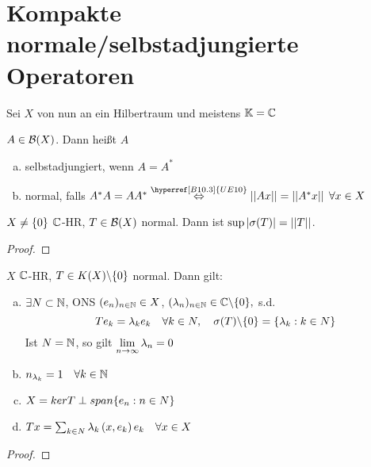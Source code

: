	\section{Kompakte normale/selbstadjungierte Operatoren}
	Sei $X$ von nun an ein Hilbertraum und meistens $\mathbb{K} = \mathbb{C}$

	\begin{definition}
	\label{def:5.20}
		$A \in \BS[X]$. Dann heißt $A$ 
			\begin{enumerate}[a)]
				\item selbstadjungiert, wenn $A = A^*$
				\item normal, falls $A^* A = A A^* \aq[{\hyperref[B10.3]{UE10}}] 
					\norm{Ax} = \norm{A^* x} \; \forall x \in X$ 
			\end{enumerate}
	\end{definition}
	
	\begin{lemma}
	\label{lem:5.21}
		$X \neq \{0\}$ $\mathbb{C}$-HR, $T\in \BS[X]$ normal. Dann ist $\sup|\sigma(T)| = \left\lvert \left\lvert T \right\rvert \right\rvert$.
	\end{lemma}

	\begin{proof}
		\todor	
	\end{proof}

		
	\begin{thm}
	\label{thm:5.22}
		$X$ $\mathbb{C}$-HR, $T\in K(X)\backslash\{0\}$ normal. Dann gilt:
			\begin{enumerate}[a)]
				\item $\exists N\subset \mathbb{N}$, ONS $(e_n)_{n\in\mathbb{N}} \in X$, 
					$(\lambda_n)_{n\in\mathbb{N}}\in \mathbb{C}\backslash\{0\},$ s.d. 
					$$ T e_k = \lambda_k e_k \quad \forall k\in N, \quad 
						\sigma(T)\backslash\{0\} = \{\lambda_k: k \in N\} $$
				Ist $N = \mathbb{N}$, so gilt $\displaystyle \lim_{n \to \infty} \lambda_n = 0$
				\item $n_{\lambda_k} = 1 \quad \forall k\in\mathbb{N}$
				\item $X = ker T \perp span\{e_n : n\in N\}$
				\item $Tx = \sum_{k\in N} \lambda_k \left (x,e_k \right) e_k \quad \forall x \in X$
			\end{enumerate}
	\end{thm}
	
	\begin{proof}
		\todor	
	\end{proof}

